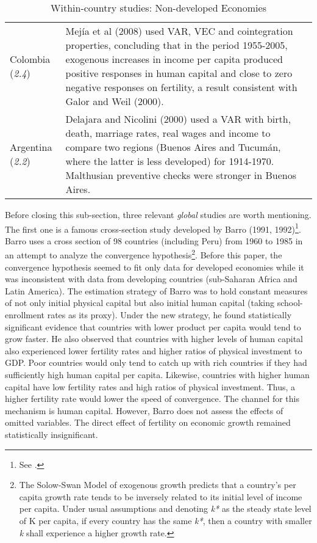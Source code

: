 \documentclass[12pt]{article}%
\begin{document}
\begin{table}[h]
\begin{center}
\begin{tabularx}{\linewidth}{lX}
Colombia (\emph{2.4}) & Mej\'ia et al (2008) used VAR, VEC and cointegration properties, concluding that in the period
1955-2005, exogenous increases in income per capita produced positive responses in human capital and close to zero negative responses on fertility, a result consistent with Galor and Weil (2000).\\
Argentina (\emph{2.2}) & Delajara and Nicolini (2000) used a VAR with birth, death, marriage rates, real wages and income to compare two regions (Buenos Aires and Tucum\'an, where the latter is less developed) for 1914-1970. Malthusian preventive checks were stronger in Buenos Aires.
\\ \end{tabularx}
\end{center}
\caption{Within-country studies: Non-developed Economies}
\label{tab:}
\end{table}
Before closing this sub-section, three relevant \emph{global} studies are worth mentioning. The first one is a famous cross-section study developed by Barro (1991, 1992)\footnote{See \cite{barro2}.}. Barro uses a cross section of 98 countries (including Peru) from 1960 to 1985 in an attempt to analyze the convergence hypothesis\footnote{The Solow-Swan Model of exogenous growth predicts that a country's per capita growth rate tends to be inversely related to its initial level of income per capita. Under usual assumptions and denoting \emph{k*} as the steady state level of K per capita, if every country has the same \emph{k*}, then a country with smaller \emph{k} shall experience a higher growth rate.}. Before this paper, the convergence hypothesis seemed to fit only data for developed economies while it was inconsistent with data from developing countries (sub-Saharan Africa and Latin America). The estimation strategy of Barro was to hold constant measures of not only initial physical capital but also initial human capital (taking school-enrollment rates as its proxy). Under the new strategy, he found statistically significant evidence that countries with lower product per capita would tend to grow faster. He also observed that countries with higher levels of human capital also experienced lower fertility rates and higher ratios of physical investment to GDP. Poor countries would only tend to catch up with rich countries if they had sufficiently high human capital per capita. Likewise, countries with higher human capital have low fertility rates and high ratios of physical investment. Thus, a higher fertility rate would lower the speed of convergence. The channel for this mechanism is human capital. However, Barro does not assess the effects of omitted variables. The direct effect of fertility on economic growth remained statistically insignificant.
\end{document}
